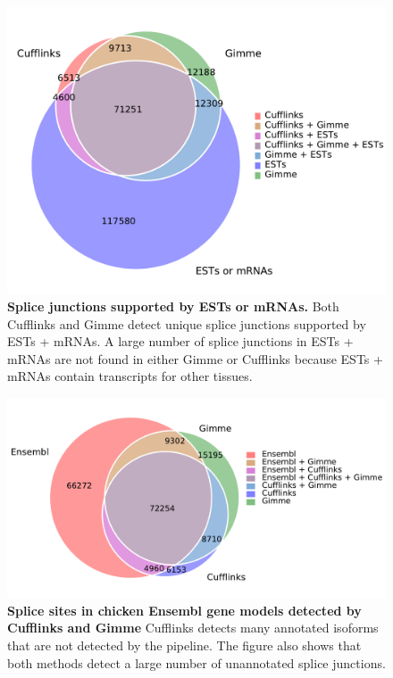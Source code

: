 \documentclass[10pt]{article}
\begin{document}
\begin{figure}[!ht]
\begin{center}
\includegraphics[width=5in]{chick_est_venn.pdf}
\end{center}
\caption{
    {\bf Splice junctions supported by ESTs or mRNAs.}
    Both Cufflinks and Gimme detect unique splice junctions
    supported by ESTs + mRNAs. A large number of splice junctions
    in ESTs + mRNAs are not found in either Gimme or Cufflinks
    because ESTs + mRNAs contain transcripts for other tissues.
}
\label{chick_est_venn}
\end{figure}

\begin{figure}[!ht]
\begin{center}
\includegraphics[width=5in]{chick_venn.pdf}
\end{center}
\caption{
{\bf Splice sites in chicken Ensembl gene models detected by
Cufflinks and Gimme}
Cufflinks detects many annotated isoforms that are not detected
by the pipeline.  The figure also shows that both methods detect
a large number of unannotated splice junctions.}
\label{chick_venn}
\end{figure}
\end{document}
